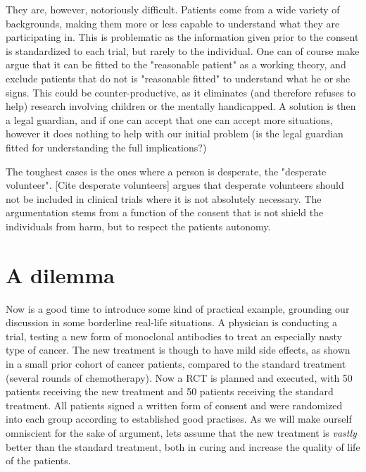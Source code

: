 \documentclass[12p]{article}
\begin{document}
They are, however, notoriously difficult.
Patients come from a wide variety of backgrounds, making them more or less capable to understand what they are participating in.
This is problematic as the information given prior to the consent is standardized to each trial, but rarely to the individual.
One can of course make argue that it can be fitted to the "reasonable patient" as a working theory, and exclude patients that do not is "reasonable fitted" to understand what he or she signs.
This could be counter-productive, as it eliminates (and therefore refuses to help) research involving children or the mentally handicapped.
A solution is then a legal guardian, and if one can accept that one can accept more situations, however it does nothing to help with our initial problem (is the legal guardian fitted for understanding the full implications?)

The toughest cases is the ones where a person is desperate, the "desperate volunteer".
[Cite desperate volunteers] argues that desperate volunteers should not be included in clinical trials where it is not absolutely necessary.
The argumentation stems from a function of the consent that is not shield the individuals from harm, but to respect the patients autonomy.




\section*{A dilemma}

Now is a good time to introduce some kind of practical example, grounding our discussion in some borderline real-life situations.
A physician is conducting a trial, testing a new form of monoclonal antibodies to treat an especially nasty type of cancer.
The new treatment is though to have mild side effects, as shown in a small prior cohort of cancer patients, compared to the standard treatment (several rounds of chemotherapy).
Now a RCT is planned and executed, with 50 patients receiving the new treatment and 50 patients receiving the standard treatment.
All patients signed a written form of consent and were randomized into each group according to established good practises.
As we will make ourself omniscient for the sake of argument, lets assume that the new treatment is \emph{vastly} better than the standard treatment, both in curing and increase the quality of life of the patients.
\end{document}
